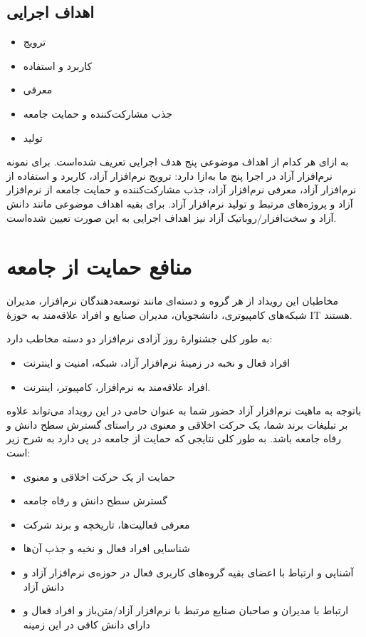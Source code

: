 \documentclass{article}
\begin{document}
\subsection{اهداف اجرایی}

\begin{flushright}
\begin{itemize}
\item ترویج
\item کاربرد و استفاده
\item معرفی
\item جذب مشارکت‌کننده و حمایت جامعه
\item تولید
\end{itemize}
\end{flushright}

به ازای هر کدام از اهداف موضوعی پنج هدف اجرایی تعریف شده‌است. برای نمونه نرم‌افزار آزاد در اجرا پنج ما به‌ازا دارد: ترویج نرم‌افزار آزاد، کاربرد و استفاده از نرم‌افزار آزاد، معرفی نرم‌افزار آزاد، جذب مشارکت‌کننده و حمایت جامعه از نرم‌افزار آزاد و پروژه‌های مرتبط و تولید نرم‌افزار آزاد. برای بقیه اهداف موضوعی مانند دانش آزاد و سخت‌افزار/روباتیک آزاد نیز اهداف اجرایی به این صورت تعیین شده‌است.

\section{منافع حمایت از جامعه}
مخاطبان این رویداد از هر گروه و دسته‌ای مانند توسعه‌دهندگان نرم‌افزار، مدیران شبکه‌های کامپیوتری، دانشجویان، مدیران صنایع و افراد علاقه‌مند به حوزهٔ IT  هستند.

\begin{flushright}

به طور کلی جشنوارهٔ روز‌ آزادی نرم‌افزار دو دسته مخاطب دارد:
\begin{itemize}
\item افراد فعال و نخبه در زمینهٔ نرم‌افزار آزاد، شبکه، امنیت و اینترنت
\item افراد علاقه‌مند به نرم‌افزار، کامپیوتر، اینترنت.
\end{itemize}

\end{flushright}
\begin{flushright}

باتوجه به ماهیت نرم‌افزار آزاد حضور شما به عنوان حامی در این رویداد می‌تواند علاوه‌ بر تبلیغات برند شما، یک حرکت اخلاقی و معنوی در راستای گسترش سطح دانش و رفاه جامعه باشد. به طور کلی نتایجی که حمایت از جامعه در پی دارد به شرح زیر است:
\begin{itemize}
\item حمایت از یک حرکت اخلاقی و معنوی
\item گسترش سطح دانش و رفاه جامعه
\item معرفی فعالیت‌ها، تاریخچه و برند شرکت
\item شناسایی افراد فعال و نخبه و جذب آن‌ها
\item آشنایی و ارتباط با اعضای بقیه گروه‌های کاربری فعال در حوزه‌ی نرم‌افزار آزاد و دانش آزاد
\item ارتباط با مدیران و صاحبان صنایع مرتبط با نرم‌افزار آزاد/متن‌باز و افراد فعال و دارای دانش کافی در این زمینه
\end{itemize}

\end{flushright}
\end{document}

